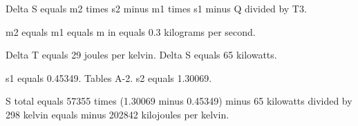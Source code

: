 Delta S equals m2 times s2 minus m1 times s1 minus Q divided by T3.  

m2 equals m1 equals m in equals 0.3 kilograms per second.  

Delta T equals 29 joules per kelvin.  
Delta S equals 65 kilowatts.  

s1 equals 0.45349.  
Tables A-2.  
s2 equals 1.30069.  

S total equals 57355 times (1.30069 minus 0.45349) minus 65 kilowatts divided by 298 kelvin equals minus 202842 kilojoules per kelvin.